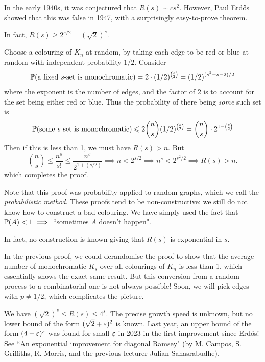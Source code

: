 \documentclass{article}
\begin{document}
In the early 1940s, it was conjectured that $R(s) \sim cs^2$. However, Paul Erd{\H o}s showed that this was false in 1947, with a surprisingly easy-to-prove theorem.

\begin{theorem}
    \label{erdos-ramsey-bound}
    In fact, $R(s) \geq 2^{s/2} = (\sqrt{2})^s$.
\end{theorem}

\begin{prf}
    Choose a colouring of $K_n$ at random, by taking each edge to be red or blue at random with independent probability $1/2$. Consider
    \[
	\P(\text{a fixed $s$-set is monochromatic}) = 2 \cdot (1/2)^{\binom{s}{2}} = (1/2)^{(s^2 - s - 2)/2}
	\]
	where the exponent is the number of edges, and the factor of 2 is to account for the set being either red or blue. Thus the probability of there being \textit{some} such set is
	\[
	\P(\text{some $s$-set is monochromatic}) \leq 2 \binom{n}{s} (1/2)^{\binom{s}{2}} = \binom{n}{s} \cdot 2^{1 - \binom{s}{2}}
	\]
	Then if this is less than 1, we must have $R(s) > n$. But
	\[
	\binom n s \leq \frac{n^s}{s!} \leq \frac{n^s}{2^{1 + (s/2)}} \implies n < 2^{s/2} \implies n^s < 2^{s^2/2} \implies R(s) > n.
	\]
	which completes the proof.
\end{prf}

Note that this proof was probability applied to random graphs, which we call the \textit{probabilistic method}. These proofs tend to be non-constructive: we still do not know how to construct a bad colouring. We have simply used the fact that $\P(A) < 1 \implies$ ``sometimes $A$ doesn't happen".

In fact, no construction is known giving that $R(s)$ is exponential in $s$.

In the previous proof, we could derandomise the proof to show that the average number of monochromatic $K_s$ over all colourings of $K_n$ is less than 1, which essentially shows the exact same result. But this conversion from a random process to a combinatorial one is not always possible! Soon, we will pick edges with $p \neq 1/2$, which complicates the picture.

We have $(\sqrt 2)^s \leq R(s) \leq 4^s$. The precise growth speed is unknown, but no lower bound of the form $(\sqrt 2 + \eps)^2$ is known. Last year, an upper bound of the form $(4 - \eps)^s$ was found for small $\eps$ in 2023 in the first improvement since Erd{\H o}s! See \hyperlink{https://arxiv.org/abs/2303.09521}{``An exponential improvement for diagonal Ramsey"} (by M. Campos, S. Griffiths, R. Morris, and the previous lecturer Julian Sahasrabudhe).
\end{document}
